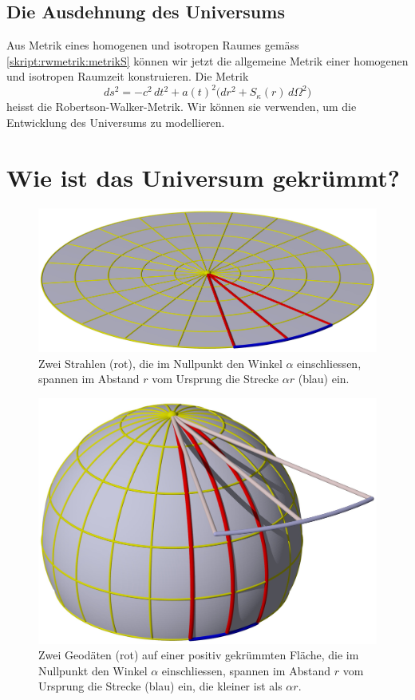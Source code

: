 \subsection{Die Ausdehnung des Universums}
Aus Metrik eines homogenen und isotropen Raumes gemäss
\eqref{skript:rwmetrik:metrikS}
können wir jetzt die allgemeine Metrik einer homogenen und
isotropen Raumzeit konstruieren.
Die Metrik
\begin{equation}
ds^2
=
-c^2\,dt^2 
+
a(t)^2\bigl( dr^2 + S_\kappa(r) \,d\Omega^2\bigr)
\label{skript:rwmetrik:rwmetrik}
\end{equation}
heisst die Robertson-Walker-Metrik.
Wir können sie verwenden, um die Entwicklung des Universums zu
modellieren.

\section{Wie ist das Universum gekrümmt?}
\begin{figure}
\centering
\includegraphics[width=0.7\hsize]{chapters/3d/pringles-flach.jpg}
\caption{Zwei Strahlen (rot), die im Nullpunkt den Winkel $\alpha$
einschliessen, spannen im Abstand $r$ vom Ursprung die Strecke
$\alpha r$ (blau) ein.
\label{skript:pringles:flach}}
\end{figure}
%
\begin{figure}
\centering
\includegraphics[width=0.7\hsize]{chapters/3d/pringles-positiv.jpg}
\caption{Zwei Geodäten (rot) auf einer positiv gekrümmten Fläche,
die im Nullpunkt den Winkel $\alpha$ einschliessen, spannen im Abstand
$r$ vom Ursprung die Strecke (blau) ein, die kleiner ist als
$\alpha r$.
\label{skript:pringles:positiv}}
\end{figure}

